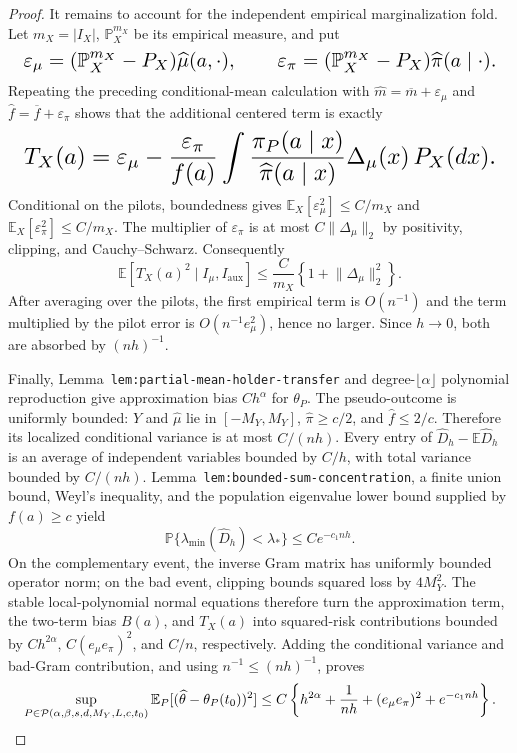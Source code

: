 \documentclass{article}
\begin{document}
\begin{proof}
It remains to account for the independent empirical marginalization fold. Let \(m_X=\lvert I_X\rvert\), \(\mathbb P_X^{m_X}\) be its empirical measure, and put
\[
\makebox[\linewidth][c]{\resizebox{0.98\linewidth}{!}{\(\displaystyle \varepsilon_\mu=(\mathbb P_X^{m_X}-P_X)\widehat\mu(a,\cdot),
\qquad
\varepsilon_\pi=(\mathbb P_X^{m_X}-P_X)\widehat\pi(a\mid\cdot).\)}}
\]
Repeating the preceding conditional-mean calculation with \(\widehat m=\overline m+\varepsilon_\mu\) and \(\widehat f=\overline f+\varepsilon_\pi\) shows that the additional centered term is exactly
\[
\makebox[\linewidth][c]{\resizebox{0.98\linewidth}{!}{\(\displaystyle T_X(a)=\varepsilon_\mu-\frac{\varepsilon_\pi}{f(a)}
\int\frac{\pi_P(a\mid x)}{\widehat\pi(a\mid x)}\Delta_\mu(x)\,P_X(dx).\)}}
\]
Conditional on the pilots, boundedness gives \(\mathbb E_X[\varepsilon_\mu^2]\le C/m_X\) and \(\mathbb E_X[\varepsilon_\pi^2]\le C/m_X\). The multiplier of \(\varepsilon_\pi\) is at most \(C\lVert\Delta_\mu\rVert_2\) by positivity, clipping, and Cauchy--Schwarz. Consequently
\[
\mathbb E[T_X(a)^2\mid I_\mu,I_{\mathrm{aux}}]
\le \frac{C}{m_X}\left\{1+\lVert\Delta_\mu\rVert_2^2\right\}.
\]
After averaging over the pilots, the first empirical term is \(O(n^{-1})\) and the term multiplied by the pilot error is \(O(n^{-1}e_\mu^2)\), hence no larger. Since \(h\to0\), both are absorbed by \((nh)^{-1}\).

Finally, Lemma~\texttt{lem:partial-mean-holder-transfer} and degree-\(\lfloor\alpha\rfloor\) polynomial reproduction give approximation bias \(Ch^\alpha\) for \(\theta_P\). The pseudo-outcome is uniformly bounded: \(Y\) and \(\widehat\mu\) lie in \([-M_Y,M_Y]\), \(\widehat\pi\ge c/2\), and \(\widehat f\le2/c\). Therefore its localized conditional variance is at most \(C/(nh)\). Every entry of \(\widehat D_h-\mathbb E\widehat D_h\) is an average of independent variables bounded by \(C/h\), with total variance bounded by \(C/(nh)\). Lemma~\texttt{lem:bounded-sum-concentration}, a finite union bound, Weyl's inequality, and the population eigenvalue lower bound supplied by \(f(a)\ge c\) yield
\[
\mathbb P\{\lambda_{\min}(\widehat D_h)<\lambda_*\}\le Ce^{-c_1nh}.
\]
On the complementary event, the inverse Gram matrix has uniformly bounded operator norm; on the bad event, clipping bounds squared loss by \(4M_Y^2\). The stable local-polynomial normal equations therefore turn the approximation term, the two-term bias \(B(a)\), and \(T_X(a)\) into squared-risk contributions bounded by \(Ch^{2\alpha}\), \(C(e_\mu e_\pi)^2\), and \(C/n\), respectively. Adding the conditional variance and bad-Gram contribution, and using \(n^{-1}\le(nh)^{-1}\), proves
\[
\makebox[\linewidth][c]{\resizebox{0.98\linewidth}{!}{\(\displaystyle \sup_{P\in\mathcal P(\alpha,\beta,s,d,M_Y,L,c,t_0)}
\mathbb E_P[(\widehat\theta-\theta_P(t_0))^2]
\le C\left\{h^{2\alpha}+\frac1{nh}+(e_\mu e_\pi)^2+e^{-c_1nh}\right\}.\)}}
\]
\end{proof}
\end{document}

